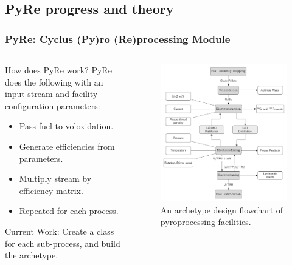 \subsection{PyRe progress and theory}
\begin{frame}
\frametitle{PyRe: Cyclus (Py)ro (Re)processing Module}
\begin{columns}
	\begin{column}{.45\textwidth}
		\begin{block}{How does PyRe work?} 
			PyRe does the following with an input stream and facility configuration parameters: 
			\begin{itemize}
				\item Pass fuel to voloxidation.
				\item Generate efficiencies from parameters.
				\item Multiply stream by efficiency matrix.
				\item Repeated for each process.
			\end{itemize}
		\end{block}
		\begin{block}{Current Work:} 
		Create a class for each sub-process, and build the archetype. 
		\end{block}
	\end{column}
	\begin{column}{.55\textwidth}
		\begin{figure}
			\centering
			\includegraphics[width=0.9\linewidth]{flowchart}
			\caption{An archetype design flowchart of pyroprocessing facilities.}
			\label{fig:pyre}
		\end{figure}
	\end{column}
\end{columns} 
\end{frame}
